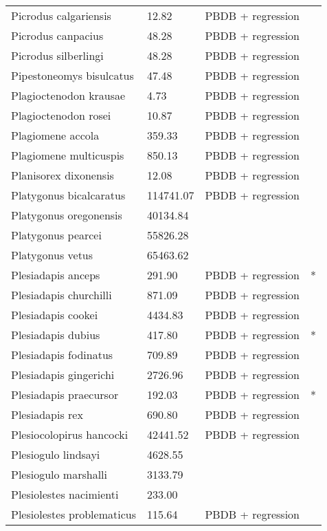 \documentclass{article}
\begin{document}
\begin{center}
\begin{longtable}{p{} p{} p{} p{}}
    Picrodus calgariensis & 12.82 & PBDB + regression &  \\ 
    Picrodus canpacius & 48.28 & PBDB + regression &  \\ 
    Picrodus silberlingi & 48.28 & PBDB + regression &  \\ 
    Pipestoneomys bisulcatus & 47.48 & PBDB + regression &  \\ 
    Plagioctenodon krausae & 4.73 & PBDB + regression &  \\ 
    Plagioctenodon rosei & 10.87 & PBDB + regression &  \\ 
    Plagiomene accola & 359.33 & PBDB + regression &  \\ 
    Plagiomene multicuspis & 850.13 & PBDB + regression &  \\ 
    Planisorex dixonensis & 12.08 & PBDB + regression &  \\ 
    Platygonus bicalcaratus & 114741.07 & PBDB + regression &  \\ 
    Platygonus oregonensis & 40134.84 & \cite{Tomiya2013} &  \\ 
    Platygonus pearcei & 55826.28 & \cite{Tomiya2013} &  \\ 
    Platygonus vetus & 65463.62 & \cite{Brook2004a} &  \\ 
    Plesiadapis anceps & 291.90 & PBDB + regression & * \\ 
    Plesiadapis churchilli & 871.09 & PBDB + regression &  \\ 
    Plesiadapis cookei & 4434.83 & PBDB + regression &  \\ 
    Plesiadapis dubius & 417.80 & PBDB + regression & * \\ 
    Plesiadapis fodinatus & 709.89 & PBDB + regression &  \\ 
    Plesiadapis gingerichi & 2726.96 & PBDB + regression &  \\ 
    Plesiadapis praecursor & 192.03 & PBDB + regression & * \\ 
    Plesiadapis rex & 690.80 & PBDB + regression &  \\ 
    Plesiocolopirus hancocki & 42441.52 & PBDB + regression &  \\ 
    Plesiogulo lindsayi & 4628.55 & \cite{Tomiya2013} &  \\ 
    Plesiogulo marshalli & 3133.79 & \cite{Tomiya2013} &  \\ 
    Plesiolestes nacimienti & 233.00 & \cite{Soligo2006} &  \\ 
    Plesiolestes problematicus & 115.64 & PBDB + regression &  \\ 

\end{longtable}
\end{center}
\end{document}
